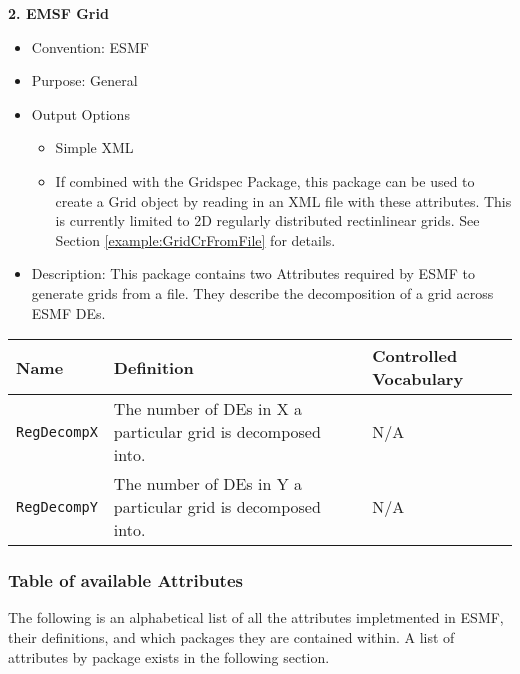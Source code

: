 \vspace{.20in}
{\bf 2. EMSF Grid}

\label{ESMFGridAttributePackage}

\begin{itemize}
    \item Convention: ESMF
    \item Purpose: General
    \item Output Options
    \begin{itemize}
        \item Simple XML
        \item If combined with the Gridspec Package, this package can be used to create a Grid object by reading in an XML file with these attributes. This is currently limited to 2D regularly distributed rectinlinear grids. See Section \ref{example:GridCrFromFile} for details. 
    \end{itemize}
    \item Description: This package contains two Attributes required by ESMF to generate grids from a file. They describe the decomposition of a grid across ESMF DEs.  
\end{itemize}


\begin{tabular}{|p{8cm}|p{20cm}|p{10cm}|}
{\bf Name} & {\bf Definition} & {\bf Controlled Vocabulary} \\
\hline\hline
{\tt RegDecompX} & The number of DEs in X a particular grid is decomposed into.& N/A\\
{\tt RegDecompY} & The number of DEs in Y a particular grid is decomposed into.& N/A\\
\end{tabular}



\vspace{.20in}
\subsubsection{Table of available Attributes}

The following is an alphabetical list of all the attributes impletmented in ESMF, their definitions, and which packages they are contained within. A list of attributes by package exists in the following section. 


